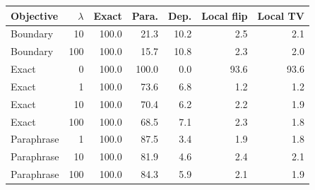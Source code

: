 \begin{tabular}{lrrrrrr}
\toprule
Objective & $\lambda$ & Exact & Para. & Dep. & Local flip & Local TV \\
\midrule
Boundary & 10 & 100.0 & 21.3 & 10.2 & 2.5 & 2.1 \\
Boundary & 100 & 100.0 & 15.7 & 10.8 & 2.3 & 2.0 \\
Exact & 0 & 100.0 & 100.0 & 0.0 & 93.6 & 93.6 \\
Exact & 1 & 100.0 & 73.6 & 6.8 & 1.2 & 1.2 \\
Exact & 10 & 100.0 & 70.4 & 6.2 & 2.2 & 1.9 \\
Exact & 100 & 100.0 & 68.5 & 7.1 & 2.3 & 1.8 \\
Paraphrase & 1 & 100.0 & 87.5 & 3.4 & 1.9 & 1.8 \\
Paraphrase & 10 & 100.0 & 81.9 & 4.6 & 2.4 & 2.1 \\
Paraphrase & 100 & 100.0 & 84.3 & 5.9 & 2.1 & 1.9 \\
\bottomrule
\end{tabular}